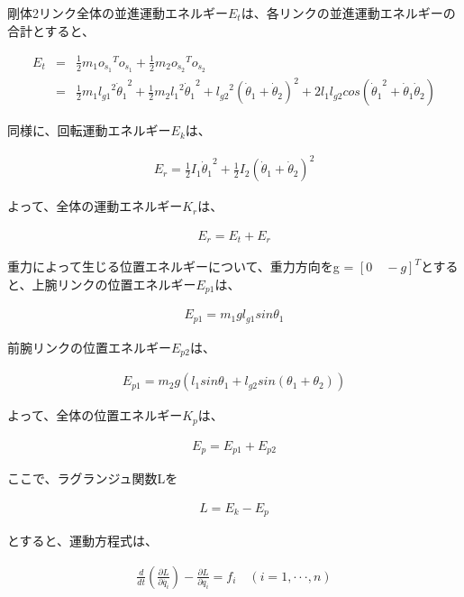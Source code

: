 剛体2リンク全体の並進運動エネルギー$E_{t}$は、各リンクの並進運動エネルギーの合計とすると、

\begin{eqnarray}
  E_{t}
  &=&\frac{1}{2}m_{1}o_{\dot{s}_{1}}{}^T\!o_{\dot{s}_{1}} + \frac{1}{2}m_{2}o_{\dot{s}_{2}}{}^T\!o_{\dot{s}_{2}} \nonumber \\
  &=&\frac{1}{2}m_{1}{l_{g1}}^2{\dot{\theta}_{1}}^2 + \frac{1}{2}m_{2}{{{l_{1}}^2}{\dot{\theta}_{1}}^2 + {l_{g2}}^2(\dot{\theta}_{1} + \dot{\theta}_{2})^2 + 2{l_{1}}{l_{g2}}cos({\dot{\theta}_{1}}^2 + \dot{\theta}_{1}\dot{\theta}_{2})}
\end{eqnarray}

同様に、回転運動エネルギー$E_{k}$は、

\begin{eqnarray}
  E_{r}
  =\frac{1}{2}I_{1}{\dot{\theta}_{1}}^2 + \frac{1}{2}I_{2}(\dot{\theta}_{1} + \dot{\theta}_{2})^2
\end{eqnarray}

よって、全体の運動エネルギー$K_{r}$は、

\begin{eqnarray}
  E_{r}
  =E_{t} + E_{r}
\end{eqnarray}

重力によって生じる位置エネルギーについて、重力方向をg = ${[0 \quad -g]}^T$とすると、上腕リンクの位置エネルギー$E_{p1}$は、

\begin{eqnarray}
  E_{p1}
  =m_{1}gl_{g1}sin\theta_{1}
\end{eqnarray}

前腕リンクの位置エネルギー$E_{p2}$は、

\begin{eqnarray}
  E_{p1}
  =m_{2}g(l_{1}sin\theta_{1} + l_{g2}sin(\theta_{1} + \theta_{2}))
\end{eqnarray}

よって、全体の位置エネルギー$K_{p}$は、

\begin{eqnarray}
  E_{p}
  =E_{p1} + E_{p2}
\end{eqnarray}

ここで、ラグランジュ関数Lを

\begin{eqnarray}
  L
  =E_{k} - E_{p}
\end{eqnarray}

とすると、運動方程式は、

\begin{eqnarray}
  \frac{d}{dt}(\frac{\partial L}{\partial \dot{q_{i}}}) - \frac{\partial L}{\partial q_{i}} = f_{i} \quad (i = 1,\cdot\cdot\cdot, n)
\end{eqnarray}

